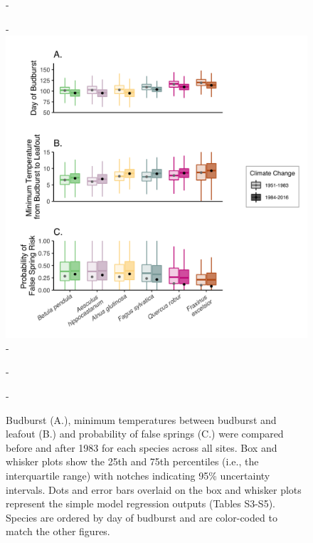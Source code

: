 \documentclass{article}\usepackage[]{graphicx}\usepackage[]{color}
\begin{document}
{\begin{figure} [H]
  -\begin{center}
  -\includegraphics[width=14cm]{..//analyses/figures/Boxplot_BBTminFS_noDots_modests.png}
  -\caption{Budburst (A.), minimum temperatures between budburst and leafout (B.) and probability of false springs (C.) were compared before and after 1983 for each species across all sites. Box and whisker plots show the 25th and 75th percentiles (i.e., the interquartile range) with notches indicating 95\% uncertainty intervals. Dots and error bars overlaid on the box and whisker plots represent the simple model regression outputs (Tables S3-S5). Species are ordered by day of budburst and are color-coded to match the other figures.  }\label{fig:boxfs}
  -\end{center}
  -\end{figure}}
  
\end{document}
